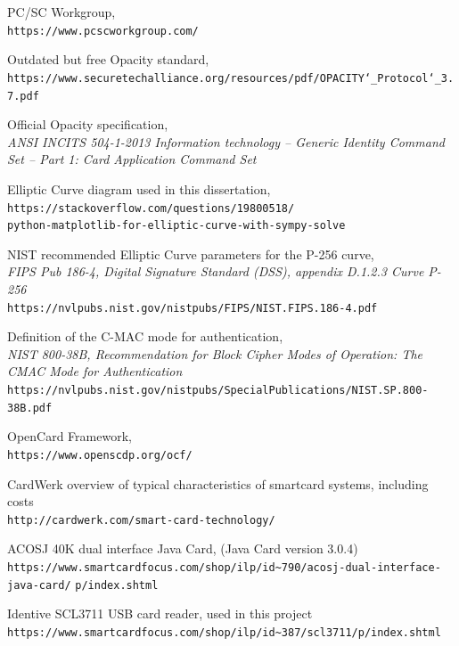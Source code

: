 \documentclass[12pt,a4paper]{article}
\begin{document}
\pagebreak
\begin{thebibliography}{9}
	PC/SC Workgroup,\\
	\texttt{https://www.pcscworkgroup.com/}
	
	Outdated but free Opacity standard,\\
	\texttt{https://www.securetechalliance.org/resources/pdf/OPACITY\char`_Protocol\char`_3.7.pdf}
	
	Official Opacity specification, \\
	\textit{ANSI INCITS 504-1-2013 Information technology – Generic Identity Command Set – Part 1: Card Application Command Set}
	
	Elliptic Curve diagram used in this dissertation,\\
	\texttt{https://stackoverflow.com/questions/19800518/ \\
	python-matplotlib-for-elliptic-curve-with-sympy-solve}
	
	NIST recommended Elliptic Curve parameters for the P-256 curve,\\
	\textit{FIPS Pub 186-4, Digital Signature Standard (DSS), appendix D.1.2.3 Curve P-256}\\
	\texttt{https://nvlpubs.nist.gov/nistpubs/FIPS/NIST.FIPS.186-4.pdf}
	
	Definition of the C-MAC mode for authentication,\\
	\textit{NIST 800-38B, Recommendation for Block Cipher Modes of Operation: The CMAC Mode for Authentication}\\
	\texttt{https://nvlpubs.nist.gov/nistpubs/SpecialPublications/NIST.SP.800-38B.pdf}
	
	OpenCard Framework,\\
	\texttt{https://www.openscdp.org/ocf/}
	
	CardWerk overview of typical characteristics of smartcard systems, including costs\\
	\verb|http://cardwerk.com/smart-card-technology/|
	
	ACOSJ 40K dual interface Java Card, (Java Card version 3.0.4)\\
	\verb|https://www.smartcardfocus.com/shop/ilp/id~790/acosj-dual-interface-java-card/|
	\verb|p/index.shtml|
	
	
	Identive SCL3711 USB card reader, used in this project\\
	\verb|https://www.smartcardfocus.com/shop/ilp/id~387/scl3711/p/index.shtml|


\end{thebibliography}
\end{document}
